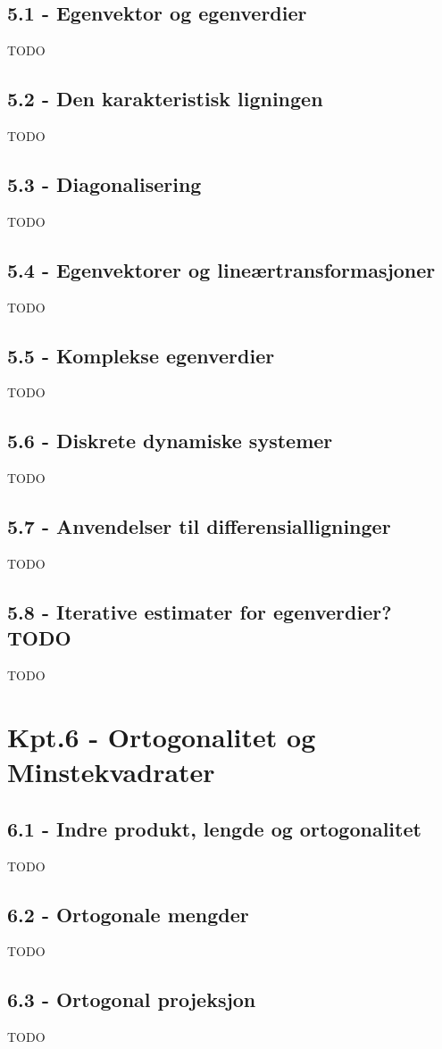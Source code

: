 \documentclass{article}
\begin{document}
    \subsection{5.1 - Egenvektor og egenverdier}
      TODO
    \subsection{5.2 - Den karakteristisk ligningen}
      TODO
    \subsection{5.3 - Diagonalisering}
      TODO
    \subsection{5.4 - Egenvektorer og lineærtransformasjoner}
      TODO
    \subsection{5.5 - Komplekse egenverdier}
      TODO
    \subsection{5.6 - Diskrete dynamiske systemer}
      TODO
    \subsection{5.7 - Anvendelser til differensialligninger}
      TODO
    \subsection{5.8 - Iterative estimater for egenverdier? TODO}
      TODO
  \section{Kpt.6 - Ortogonalitet og Minstekvadrater}
    \subsection{6.1 - Indre produkt, lengde og ortogonalitet}
      TODO
    \subsection{6.2 - Ortogonale mengder}
      TODO
    \subsection{6.3 - Ortogonal projeksjon}
      TODO
\end{document}
